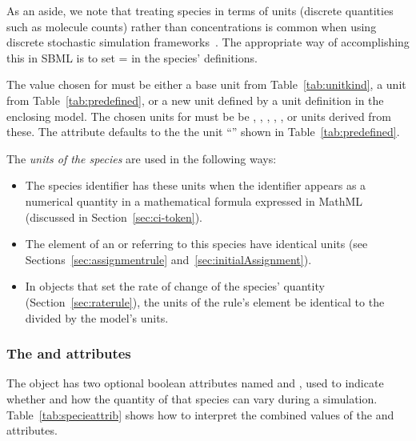 As an aside, we note that treating species in terms of
 units (\ie discrete quantities such as
molecule counts) rather than concentrations is common when using
discrete stochastic simulation
frameworks~\citep{gillespie:1977,wilkinson_2006}.  The appropriate
way of accomplishing this in SBML is to set
= in the species'
definitions.

The value chosen for  must be
either a base unit from Table~\vref{tab:unitkind}, a  unit
from Table~\vref{tab:predefined}, or a new unit defined by a unit
definition in the enclosing model.  The chosen units for
 must be be ,
, , , , or
units derived from these.  The 
attribute defaults to the the  unit
``'' shown in Table~\vref{tab:predefined}.

The \emph{units of the species} are used in the following ways:
\begin{itemize}

\item The species identifier has these units when the
    identifier appears as a numerical quantity in a mathematical
  formula expressed in MathML (discussed in
  Section~\ref{sec:ci-token}).

\item The  element of an \AssignmentRule or
  \InitialAssignment referring to this species  have identical
  units (see Sections~\ref{sec:assignmentrule}
  and~\ref{sec:initialAssignment}).

\item In \RateRule objects that set the rate of change of the
  species' quantity (Section~\ref{sec:raterule}), the units of the
  rule's  element  be identical to the
   divided by the model's
   units.

\end{itemize}


\subsubsection{The  and  attributes}
\label{sec:species-constant}

The \Species object has two optional boolean attributes named
 and , used to indicate
whether and how the quantity of that species can vary during a
simulation.  Table~\ref{tab:specieattrib} shows how to interpret
the combined values of the  and
 attributes.

